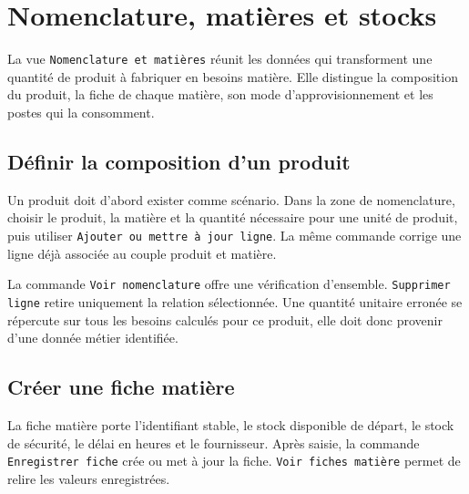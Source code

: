\chapter{Nomenclature, matières et stocks}
\label{chap:nomenclature-stocks}

La vue \texttt{Nomenclature et matières} réunit les données qui transforment une quantité de produit à fabriquer en besoins matière. Elle distingue la composition du produit, la fiche de chaque matière, son mode d'approvisionnement et les postes qui la consomment.



\section{Définir la composition d'un produit}

Un produit doit d'abord exister comme scénario. Dans la zone de nomenclature, choisir le produit, la matière et la quantité nécessaire pour une unité de produit, puis utiliser \texttt{Ajouter ou mettre à jour ligne}. La même commande corrige une ligne déjà associée au couple produit et matière.

La commande \texttt{Voir nomenclature} offre une vérification d'ensemble. \texttt{Supprimer ligne} retire uniquement la relation sélectionnée. Une quantité unitaire erronée se répercute sur tous les besoins calculés pour ce produit, elle doit donc provenir d'une donnée métier identifiée.

\section{Créer une fiche matière}

La fiche matière porte l'identifiant stable, le stock disponible de départ, le stock de sécurité, le délai en heures et le fournisseur. Après saisie, la commande \texttt{Enregistrer fiche} crée ou met à jour la fiche. \texttt{Voir fiches matière} permet de relire les valeurs enregistrées.


